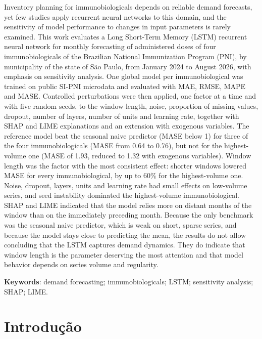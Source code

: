 \documentclass[
    12pt,
    openright,
    oneside,
    a4paper,
    english,
    brazil
]{abntex2}
\begin{document}
\begin{resumo}[Abstract]
Inventory planning for immunobiologicals depends on reliable demand forecasts, yet few studies apply recurrent neural networks to this domain, and the sensitivity of model performance to changes in input parameters is rarely examined. This work evaluates a Long Short-Term Memory (LSTM) recurrent neural network for monthly forecasting of administered doses of four immunobiologicals of the Brazilian National Immunization Program (PNI), by municipality of the state of São Paulo, from January 2024 to August 2026, with emphasis on sensitivity analysis. One global model per immunobiological was trained on public SI-PNI microdata and evaluated with MAE, RMSE, MAPE and MASE. Controlled perturbations were then applied, one factor at a time and with five random seeds, to the window length, noise, proportion of missing values, dropout, number of layers, number of units and learning rate, together with SHAP and LIME explanations and an extension with exogenous variables. The reference model beat the seasonal naive predictor (MASE below 1) for three of the four immunobiologicals (MASE from 0.64 to 0.76), but not for the highest-volume one (MASE of 1.93, reduced to 1.32 with exogenous variables). Window length was the factor with the most consistent effect: shorter windows lowered MASE for every immunobiological, by up to 60\% for the highest-volume one. Noise, dropout, layers, units and learning rate had small effects on low-volume series, and seed instability dominated the highest-volume immunobiological. SHAP and LIME indicated that the model relies more on distant months of the window than on the immediately preceding month. Because the only benchmark was the seasonal naive predictor, which is weak on short, sparse series, and because the model stays close to predicting the mean, the results do not allow concluding that the LSTM captures demand dynamics. They do indicate that window length is the parameter deserving the most attention and that model behavior depends on series volume and regularity.

\textbf{Keywords}: demand forecasting; immunobiologicals; LSTM; sensitivity analysis; SHAP; LIME.
\end{resumo}

\tableofcontents*
\cleardoublepage

\textual

\chapter{Introdução}
\label{cap:introducao}
\end{document}
